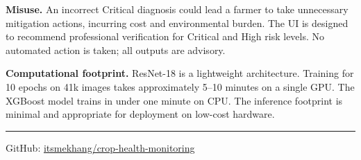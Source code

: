 \documentclass[conference]{IEEEtran}
\begin{document}
\textbf{Misuse.} An incorrect Critical diagnosis could lead a farmer to take unnecessary mitigation actions, incurring cost and environmental burden. The UI is designed to recommend professional verification for Critical and High risk levels. No automated action is taken; all outputs are advisory.

\textbf{Computational footprint.} ResNet-18 is a lightweight architecture. Training for 10 epochs on 41k images takes approximately 5--10 minutes on a single GPU. The XGBoost model trains in under one minute on CPU. The inference footprint is minimal and appropriate for deployment on low-cost hardware.

\vspace{6pt}
\noindent\rule{\columnwidth}{0.4pt}
\begin{center}
  \small GitHub: \href{https://github.com/itsmekhang/crop-health-monitoring}{itsmekhang/crop-health-monitoring}
\end{center}
\end{document}
